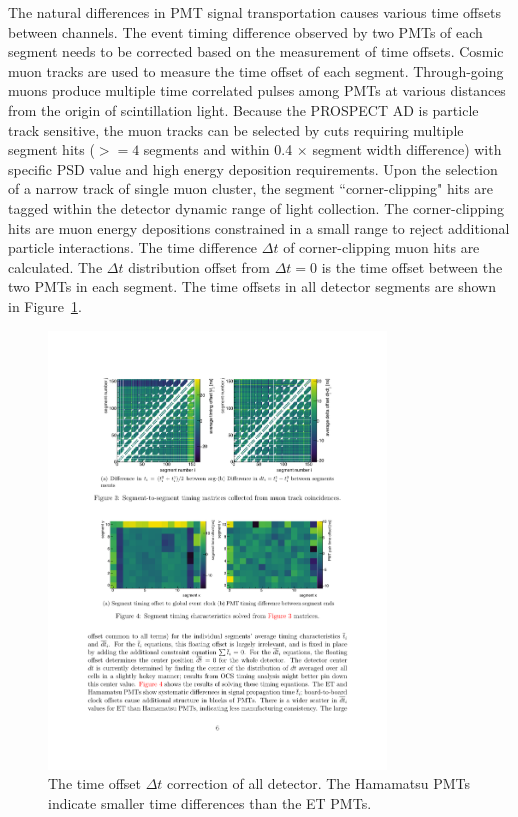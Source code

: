 The natural differences in PMT signal transportation causes various time offsets between channels.
The event timing difference observed by two PMTs of each segment needs to be corrected based on the measurement of time offsets.
Cosmic muon tracks are used to measure the time offset of each segment.
Through-going muons produce multiple time correlated pulses among PMTs at various distances from the origin of scintillation light.
Because the PROSPECT AD is particle track sensitive, the muon tracks can be selected by cuts requiring multiple segment hits ($>=4$ segments and within 0.4 $\times$ segment width difference) with specific PSD value and high energy deposition requirements. 
Upon the selection of a narrow track of single muon cluster, the segment ``corner-clipping" hits are tagged within the detector dynamic range of light collection.
The corner-clipping hits are muon energy depositions constrained in a small range to reject additional particle interactions.
The time difference $\Delta t$ of corner-clipping muon hits are calculated.
The $\Delta t$ distribution offset from $\Delta t=0$ is the time offset between the two PMTs in each segment.
The time offsets in all detector segments are shown in Figure~\ref{fig:TimeOffset}.
\begin{figure}[ht]
\centering
\includegraphics[width=0.8\textwidth]{Figures/TimeOffset.pdf}
\caption[Time offset in all detector segments]{
The time offset $\Delta t$ correction of all detector. 
The Hamamatsu PMTs indicate smaller time differences than the ET PMTs.
}
\label{fig:TimeOffset}
\end{figure}	

